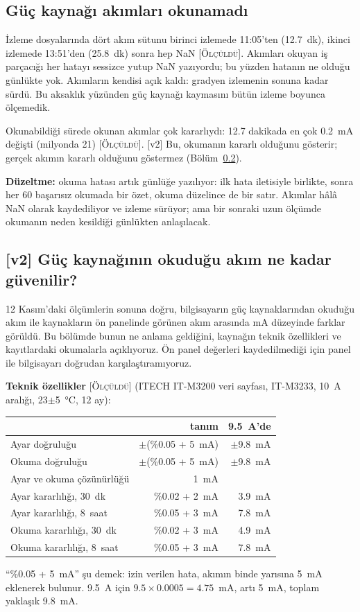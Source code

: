 \documentclass[11pt,a4paper]{article}
\newcommand{\olc}{\textsc{[Ölçüldü]}}
\begin{document}
\subsection{Güç kaynağı akımları okunamadı}
İzleme dosyalarında dört akım sütunu birinci izlemede 11:05'ten (12.7~dk), ikinci izlemede 13:51'den
(25.8~dk) sonra hep NaN \olc. Akımları okuyan iş parçacığı her hatayı sessizce yutup NaN yazıyordu; bu yüzden
hatanın ne olduğu günlükte yok. Akımların kendisi açık kaldı: gradyen izlemenin sonuna kadar sürdü. Bu
aksaklık yüzünden güç kaynağı kaymasını bütün izleme boyunca ölçemedik.

Okunabildiği sürede okunan akımlar çok kararlıydı: 12.7 dakikada en çok 0.2~mA değişti (milyonda 21) \olc.
[v2] Bu, okumanın kararlı olduğunu gösterir; gerçek akımın kararlı olduğunu göstermez (Bölüm~\ref{sec:kaynak}).

\textbf{Düzeltme:} okuma hatası artık günlüğe yazılıyor: ilk hata iletisiyle birlikte, sonra her 60
başarısız okumada bir özet, okuma düzelince de bir satır. Akımlar hâlâ NaN olarak kaydediliyor ve izleme
sürüyor; ama bir sonraki uzun ölçümde okumanın neden kesildiği günlükten anlaşılacak.

\subsection{[v2] Güç kaynağının okuduğu akım ne kadar güvenilir?}
\label{sec:kaynak}

12 Kasım'daki ölçümlerin sonuna doğru, bilgisayarın güç kaynaklarından okuduğu akım ile kaynakların ön
panelinde görünen akım arasında mA düzeyinde farklar görüldü. Bu bölümde bunun ne anlama geldiğini, kaynağın
teknik özellikleri ve kayıtlardaki okumalarla açıklıyoruz. Ön panel değerleri kaydedilmediği için panel ile
bilgisayarı doğrudan karşılaştıramıyoruz.

\textbf{Teknik özellikler} \olc{} (ITECH IT-M3200 veri sayfası, IT-M3233, 10~A aralığı, 23$\pm$5~°C, 12 ay):
\begin{center}\small
\begin{tabular}{lrr}
\toprule
 & tanım & 9.5~A'de \\
\midrule
Ayar doğruluğu & $\pm$(\%0.05 + 5~mA) & $\pm$9.8~mA \\
Okuma doğruluğu & $\pm$(\%0.05 + 5~mA) & $\pm$9.8~mA \\
Ayar ve okuma çözünürlüğü & 1~mA & \\
Ayar kararlılığı, 30~dk & \%0.02 + 2~mA & 3.9~mA \\
Ayar kararlılığı, 8~saat & \%0.05 + 3~mA & 7.8~mA \\
Okuma kararlılığı, 30~dk & \%0.02 + 3~mA & 4.9~mA \\
Okuma kararlılığı, 8~saat & \%0.05 + 3~mA & 7.8~mA \\
\bottomrule
\end{tabular}
\end{center}
``\%0.05 + 5~mA'' şu demek: izin verilen hata, akımın binde yarısına 5~mA eklenerek bulunur. 9.5~A için
$9.5 \times 0.0005 = 4.75$~mA, artı 5~mA, toplam yaklaşık 9.8~mA.
\end{document}
